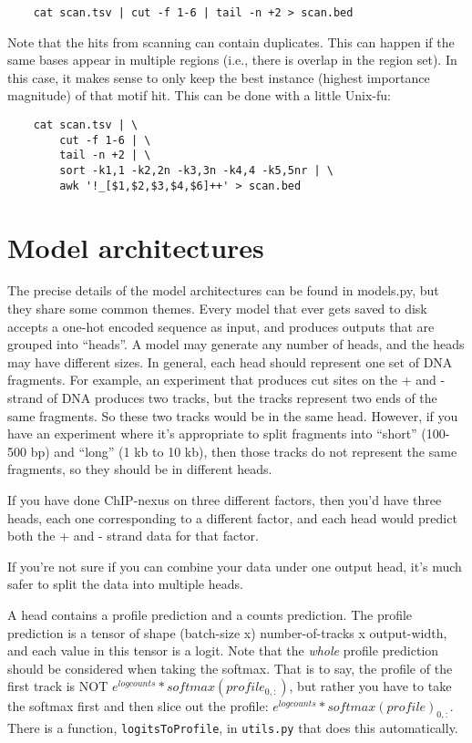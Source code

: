 \documentclass{article}
\begin{document}
\begin{lstlisting}
    cat scan.tsv | cut -f 1-6 | tail -n +2 > scan.bed
\end{lstlisting}


Note that the hits from scanning can contain duplicates.
This can happen if the same bases appear in multiple regions (i.e., there is
overlap in the region set).
In this case, it makes sense to only keep the best instance (highest importance
magnitude) of that motif hit.
This can be done with a little Unix-fu:

\begin{lstlisting}
    cat scan.tsv | \
        cut -f 1-6 | \
        tail -n +2 | \
        sort -k1,1 -k2,2n -k3,3n -k4,4 -k5,5nr | \
        awk '!_[$1,$2,$3,$4,$6]++' > scan.bed
\end{lstlisting}
\newpage
\section{Model architectures}\label{sec:modelArchitectures}

The precise details of the model architectures can be found in models.py, but
they share some common themes.
Every model that ever gets saved to disk accepts a one-hot encoded sequence as
input, and produces outputs that are grouped into ``heads''.
A model may generate any number of heads, and the heads may have different
sizes.
In general, each head should represent one set of DNA fragments.
For example, an experiment that produces cut sites on the + and - strand of DNA
produces two tracks, but the tracks represent two ends of the same fragments.
So these two tracks would be in the same head.
However, if you have an experiment where it's appropriate to split fragments into
``short'' (100-500 bp) and ``long'' (1 kb to 10 kb), then those tracks do not
represent the same fragments, so they should be in different heads.

If you have done ChIP-nexus on three different factors, then you'd have three
heads, each one corresponding to a different factor, and each head would predict
both the + and - strand data for that factor.

If you're not sure if you can combine your data under one output head, it's much
safer to split the data into multiple heads.

A head contains a profile prediction and a counts prediction.
The profile prediction is a tensor of shape
(batch-size x) number-of-tracks x output-width, and each value in this tensor
is a logit.
Note that the \emph{whole} profile prediction should be considered when taking
the softmax.
That is to say, the profile of the first track is NOT
$e^{logcounts} * softmax(profile_{0,:})$, but rather you have to take the
softmax first and then slice out the profile:
$e^{logcounts} * softmax(profile)_{0,:}$.
There is a function, \texttt{logitsToProfile}, in \texttt{utils.py} that does
this automatically.
\end{document}
